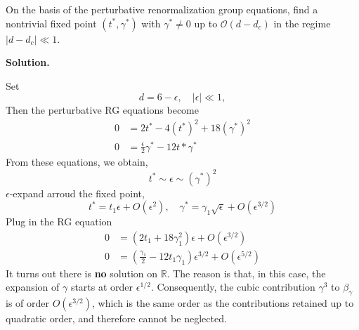 \documentclass[11pt,a4paper]{article}
\newcounter{problem}
\newcounter{saveequation}
\newenvironment{solution}
{
	\par
	\setcounter{saveequation}{\value{equation}}
	\begingroup
	\setcounter{equation}{0}
	\renewcommand{\theequation}{\arabic{problem}.\arabic{equation}}
	\renewcommand{\theHequation}{sol.\arabic{problem}.\arabic{equation}}
	\noindent\textbf{Solution.}\quad
}
{
	\par
	\endgroup
	\setcounter{equation}{\value{saveequation}}
}
\begin{document}
	\begin{problembox}
		On the basis of the perturbative renormalization group equations, find a nontrivial fixed point $(t^*,\gamma^*)$ with $\gamma^*\neq 0$ up to $\mathcal{O}(d-d_c)$ in the regime $\lvert d-d_c\rvert\ll 1$.
	\end{problembox}
	\begin{solution}
		Set
		\[
			d=6-\epsilon,\quad |\epsilon|\ll 1,
		\]
		Then the perturbative RG equations become
		\[
		\begin{aligned}
			0&=2t^*-4(t^*)^2+18(\gamma^*)^2\\
			0&=\frac{\epsilon}{2}\gamma^*-12t*\gamma^*
		\end{aligned}
		\]
		From these equations, we obtain,
		\[
		t^*\sim\epsilon\sim(\gamma^*)^2
		\]
		$\epsilon$-expand arroud the fixed point,
		\[
		t^*=t_1\epsilon+O(\epsilon^2),\quad \gamma^*=\gamma_1\sqrt{\epsilon}+O(\epsilon^{3/2})
		\]
		Plug in the RG equation
		\[
		\begin{aligned}
			0&=(2t_1+18\gamma_1^2)\epsilon+O(\epsilon^{3/2})\\
			0&=\left(\frac{\gamma_1}{2}-12t_1\gamma_1\right){\epsilon}^{3/2}+O(\epsilon^{5/2})
		\end{aligned}
		\]
		It turns out there is \textbf{no} solution on $\mathbb{R}$.  The reason is that, in this case, the expansion of $\gamma$ starts at order $\epsilon^{1/2}$. Consequently, the cubic contribution $\gamma^3$ to $\beta_\gamma$ is of order $O(\epsilon^{3/2})$, which is the same order as the contributions retained up to quadratic order, and therefore cannot be neglected.
		

\end{solution}
\end{document}
